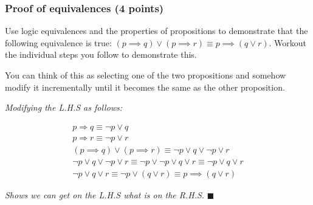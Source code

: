 \documentclass[]{book}
\theoremstyle{definition}
\begin{document}
\subsubsection*{Proof of equivalences (4 points)}
Use logic equivalences and the properties of propositions to demonstrate that the following equivalence is true: $(p \implies q) \lor (p \implies r) \equiv p \implies (q \lor r)$. Workout the individual steps you follow to demonstrate this.

You can think of this as selecting one of the two propositions and somehow modify it incrementally until it becomes the same as the other proposition.\newline
\begin{center}
	\emph{Modifying the L.H.S as follows:}
\end{center}
\begin{gather}
	p \Rightarrow q \equiv \lnot p \lor q\\
	p \Rightarrow r \equiv \lnot p \lor r\\
	(p \implies q) \lor (p \implies r) \equiv \lnot p \lor q \lor \lnot p \lor r\\
	\lnot p \lor q \lor \lnot p \lor r \equiv \lnot p \lor \lnot p \lor q \lor r \equiv \lnot p \lor q \lor r\\
	\lnot p \lor q \lor r \equiv \lnot p \lor (q \lor r) \equiv p \implies (q \lor r) 
\end{gather}
\begin{center}
	\emph{Shows we can get on the L.H.S what is on the R.H.S.} $\blacksquare$
\end{center}
\end{document}
